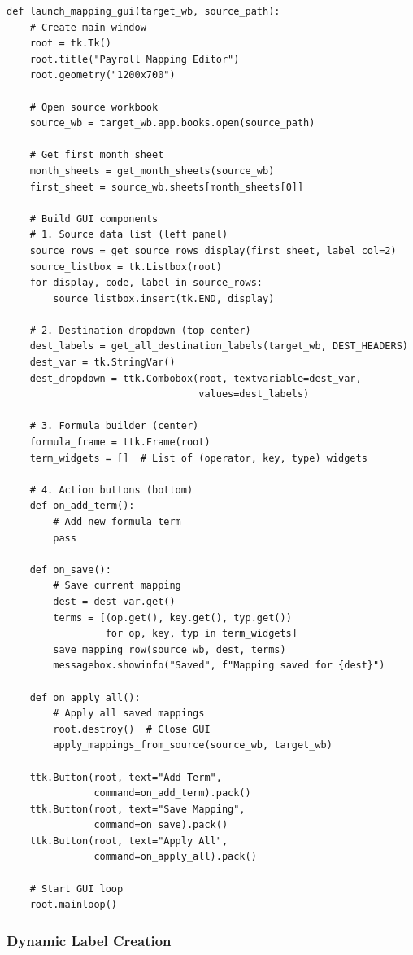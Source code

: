 \begin{lstlisting}[style=pythonstyle]
def launch_mapping_gui(target_wb, source_path):
    # Create main window
    root = tk.Tk()
    root.title("Payroll Mapping Editor")
    root.geometry("1200x700")
    
    # Open source workbook
    source_wb = target_wb.app.books.open(source_path)
    
    # Get first month sheet
    month_sheets = get_month_sheets(source_wb)
    first_sheet = source_wb.sheets[month_sheets[0]]
    
    # Build GUI components
    # 1. Source data list (left panel)
    source_rows = get_source_rows_display(first_sheet, label_col=2)
    source_listbox = tk.Listbox(root)
    for display, code, label in source_rows:
        source_listbox.insert(tk.END, display)
    
    # 2. Destination dropdown (top center)
    dest_labels = get_all_destination_labels(target_wb, DEST_HEADERS)
    dest_var = tk.StringVar()
    dest_dropdown = ttk.Combobox(root, textvariable=dest_var,
                                 values=dest_labels)
    
    # 3. Formula builder (center)
    formula_frame = ttk.Frame(root)
    term_widgets = []  # List of (operator, key, type) widgets
    
    # 4. Action buttons (bottom)
    def on_add_term():
        # Add new formula term
        pass
    
    def on_save():
        # Save current mapping
        dest = dest_var.get()
        terms = [(op.get(), key.get(), typ.get()) 
                 for op, key, typ in term_widgets]
        save_mapping_row(source_wb, dest, terms)
        messagebox.showinfo("Saved", f"Mapping saved for {dest}")
    
    def on_apply_all():
        # Apply all saved mappings
        root.destroy()  # Close GUI
        apply_mappings_from_source(source_wb, target_wb)
    
    ttk.Button(root, text="Add Term", 
               command=on_add_term).pack()
    ttk.Button(root, text="Save Mapping", 
               command=on_save).pack()
    ttk.Button(root, text="Apply All", 
               command=on_apply_all).pack()
    
    # Start GUI loop
    root.mainloop()
\end{lstlisting}

\subsubsection{Dynamic Label Creation}

